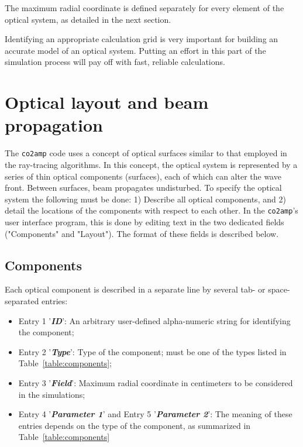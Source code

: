\documentclass{report}
\begin{document}
The maximum radial coordinate is defined separately for every element of the optical system, as detailed in the next section.

Identifying an appropriate calculation grid is very important for building an accurate model of an optical system. Putting an effort in this part of the simulation process will pay off with fast, reliable calculations.



\section{Optical layout and beam propagation}
The \texttt{co2amp} code uses a concept of optical surfaces similar to that employed in the ray-tracing algorithms. In this concept, the optical system is represented by a series of thin optical components (surfaces), each of which can alter the wave front. Between surfaces, beam propagates undisturbed. To specify the optical system the following must be done:  1) Describe all optical components, and 2) detail the locations of the components with respect to each other. In the \texttt{co2amp}'s user interface program, this is done by editing text in the two dedicated fields ("Components" and "Layout"). The format of these fields is described below. 

\subsection{Components}
Each optical component is described in a separate line by several tab- or space-separated entries:

\begin{itemize}
\item Entry 1 '\textit{\textbf{ID}}': An arbitrary user-defined alpha-numeric string for identifying the component;
\item Entry 2 '\textit{\textbf{Type}}': Type of the component; must be one of the types listed in Table~\ref{table:components};
\item Entry 3 '\textit{\textbf{Field}}': Maximum radial coordinate in centimeters to be considered in the simulations;
\item Entry 4 '\textit{\textbf{Parameter 1}}' and Entry 5 '\textit{\textbf{Parameter 2}}': The meaning of these entries depends on the type of the component, as summarized in Table~\ref{table:components}
\end{itemize}
\end{document}
